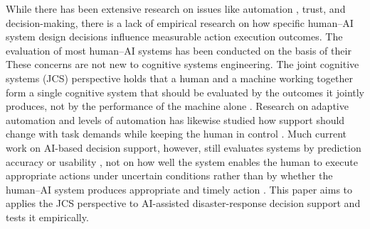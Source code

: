\documentclass[journal]{IEEEtran}
\theoremstyle{plain}
\theoremstyle{definition}
\providecommand{\DIFaddtex}[1]{{\protect\color{blue} \sf #1}} %
\providecommand{\DIFdeltex}[1]{{\protect\color{red} \scriptsize #1}} %
\providecommand{\DIFaddbegin}{} %
\providecommand{\DIFaddend}{} %
\providecommand{\DIFdelbegin}{} %
\providecommand{\DIFdelend}{} %
\providecommand{\DIFadd}[1]{\texorpdfstring{\DIFaddtex{#1}}{#1}} %
\providecommand{\DIFdel}[1]{\texorpdfstring{\DIFdeltex{#1}}{}} %
\newcommand{\DIFscaledelfig}{0.5}
\newlength{\DIFdelgraphicswidth} %
\newlength{\DIFdelgraphicsheight} %
\newcommand{\DIFaddincludegraphics}[2][]{{\color{blue}\fbox{\DIFOincludegraphics[#1]{#2}}}} %
\newcommand{\DIFdelincludegraphics}[2][]{%
\sbox{\DIFdelgraphicsbox}{\DIFOincludegraphics[#1]{#2}}%
\settoboxwidth{\DIFdelgraphicswidth}{\DIFdelgraphicsbox} %
\settoboxtotalheight{\DIFdelgraphicsheight}{\DIFdelgraphicsbox} %
\scalebox{\DIFscaledelfig}{%
\parbox[b]{\DIFdelgraphicswidth}{\usebox{\DIFdelgraphicsbox}\\[-\baselineskip] \rule{\DIFdelgraphicswidth}{0em}}\llap{\resizebox{\DIFdelgraphicswidth}{\DIFdelgraphicsheight}{%
\setlength{\unitlength}{\DIFdelgraphicswidth}%
\begin{picture}(1,1)%
\thicklines\linethickness{2pt} %
{\color[rgb]{1,0,0}\put(0,0){\framebox(1,1){}}}%
{\color[rgb]{1,0,0}\put(0,0){\line( 1,1){1}}}%
{\color[rgb]{1,0,0}\put(0,1){\line(1,-1){1}}}%
\end{picture}%
}\hspace*{3pt}}} %
} %
\DeclareRobustCommand{\DIFaddbegin}{\DIFOaddbegin \let\includegraphics\DIFaddincludegraphics} %
\DeclareRobustCommand{\DIFaddend}{\DIFOaddend \let\includegraphics\DIFOincludegraphics} %
\DeclareRobustCommand{\DIFdelbegin}{\DIFOdelbegin \let\includegraphics\DIFdelincludegraphics} %
\DeclareRobustCommand{\DIFdelend}{\DIFOaddend \let\includegraphics\DIFOincludegraphics} %
\begin{document}
\DIFdelbegin \DIFdel{While there has been extensive research on issues like automation , trust, and decision-making, there is a lack of empirical research on how specific human--AI system design decisions influence measurable action execution outcomes. The evaluation of most human--AI systems has been conducted on the basis of their }\DIFdelend \DIFaddbegin \DIFadd{These concerns are not new to cognitive systems engineering. The joint cognitive systems (JCS) perspective holds that a human and a machine working together form a single cognitive system that should be evaluated by the outcomes it jointly produces, not by the performance of the machine alone \cite{Hollnagel2005JCS,Woods2006JCS}. Research on adaptive automation and levels of automation has likewise studied how support should change with task demands while keeping the human in control \cite{Parasuraman2000LOA,Kaber2004,Scerbo2007}. Much current work on AI-based decision support, however, still evaluates systems by }\DIFaddend prediction accuracy or usability \DIFdelbegin \DIFdel{, not on how well the system enables the human to execute appropriate actions under uncertain conditions }\DIFdelend \DIFaddbegin \DIFadd{rather than by whether the human--AI system produces appropriate and timely action }\DIFaddend \cite{Lai2023FAccT,Muller2022CHIWORK,Yang2022THMSReview,lim2026generativeaidrivenreliabilitylayer}. This paper \DIFdelbegin \DIFdel{aims to }\DIFdelend \DIFaddbegin \DIFadd{applies the JCS perspective to AI-assisted disaster-response decision support and tests it empirically.
}
\end{document}
